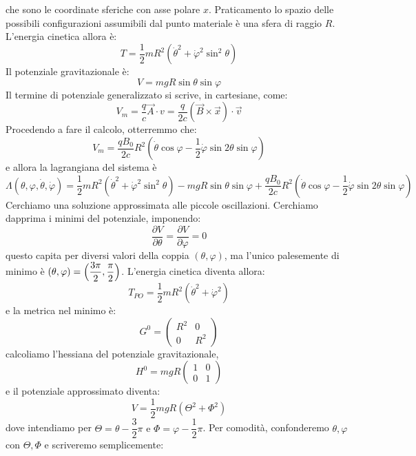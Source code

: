\documentclass[a4paper,openany]{article}
\begin{document}
	che sono le coordinate sferiche con asse polare $x$. Praticamento lo spazio delle possibili configurazioni assumibili dal punto materiale è una sfera di raggio $R$. L'energia cinetica allora è:
	$$
	T = \dfrac{1}{2}mR^{2}(\dot{\theta}^{2}+\dot{\varphi}^{2}\sin^{2}\theta)
	$$
	Il potenziale gravitazionale è:
	$$
	V = mgR\sin\theta\sin\varphi
	$$
	Il termine di potenziale generalizzato si scrive, in cartesiane, come:
	$$
	V_m = \dfrac{q}{c}\vec{A}\cdot{v} = \dfrac{q}{2c}(\vec{B}\times\vec{x})\cdot\vec{v}
	$$
	Procedendo a fare il calcolo, otterremmo che:
	\begin{equation}\label{key}
		V_m = \dfrac{qB_0}{2c}R^2(\dot{\theta}\cos\varphi-\dfrac{1}{2}\dot{\varphi}\sin2\theta\sin\varphi)
	\end{equation}
	e allora la lagrangiana del sistema è
	\begin{equation}\label{key}
		\Lambda(\theta,\varphi,\dot{\theta},\dot{\varphi}) = \dfrac{1}{2}mR^{2}(\dot{\theta}^{2}+\dot{\varphi}^{2}\sin^{2}\theta) - mgR\sin\theta\sin\varphi + \dfrac{qB_0}{2c}R^2(\dot{\theta}\cos\varphi-\dfrac{1}{2}\dot{\varphi}\sin2\theta\sin\varphi)
	\end{equation}
	Cerchiamo una soluzione approssimata alle piccole oscillazioni. Cerchiamo dapprima i minimi del potenziale, imponendo:
	$$
	\dfrac{\partial V}{\partial \theta} = \dfrac{\partial V}{\partial \varphi} = 0 
	$$
	questo capita per diversi valori della coppia $(\theta,\varphi)$, ma l'unico palesemente di minimo è $(\theta,\varphi) = \Bigl(\dfrac{3\pi}{2}, \dfrac{\pi}{2}\Bigl)$. L'energia cinetica diventa allora:
	$$
	T_{PO} = \dfrac{1}{2}mR^{2}(\dot{\theta}^{2}+\dot{\varphi}^{2})
	$$
	e la metrica nel minimo è:
	\begin{equation}\label{key}
		G^0 =
		\begin{pmatrix}
			R^2 & 0 \\
			0 & R^2 
		\end{pmatrix}
	\end{equation}
	calcoliamo l'hessiana del potenziale gravitazionale,
	\begin{equation}\label{key}
		H^0 =mgR
		\begin{pmatrix}
			1 & 0 \\
			0 & 1
		\end{pmatrix}
	\end{equation}
	e il potenziale approssimato diventa:
	\begin{equation}\label{key}
		V = \dfrac{1}{2}mgR(\Theta^{2}+\Phi^{2})
	\end{equation}
	dove intendiamo per $\Theta = \theta - \dfrac{3}{2}\pi \mbox{ e } \Phi = \varphi - \dfrac{1}{2}\pi$. Per comodità, confonderemo $\theta,\varphi$ con $\Theta,\Phi$ e scriveremo semplicemente: 
\end{document}
